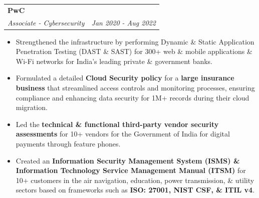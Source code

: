 \documentclass[letterpaper,11pt]{article}
\makeatletter
\newcommand{\resumeItem}[1]{
  \item\small{
    {#1 \vspace{-2pt}}
  }
}
\newcommand{\resumeSubheading}[4]{
  \vspace{-2pt}\item
    \begin{tabular*}{0.97\textwidth}[t]{l@{\extracolsep{\fill}}r}
      \textbf{#1} & #2 \\
      \textit{\small#3} & \textit{\small #4} \\
    \end{tabular*}\vspace{0pt}
}
\newcommand{\resumeItemListStart}{\begin{itemize}}
\newcommand{\resumeItemListEnd}{\end{itemize}\vspace{-5pt}}
\makeatother
\begin{document}
\resumeSubheading
      {PwC}{}
      {Associate - Cybersecurity }{Jan 2020 - Aug 2022}
      \resumeItemListStart
        \resumeItem{}
          {Strengthened the infrastructure by performing Dynamic \& Static Application Penetration Testing (DAST \& SAST) for 300+ web \& mobile applications \& Wi-Fi networks for India's leading private \& government banks.}
       \resumeItem{}
       {Formulated a detailed \textbf{Cloud Security policy} for a \textbf{large insurance business} that streamlined access controls and monitoring processes, ensuring compliance and enhancing data security for 1M+ records during their cloud migration. } 
       \resumeItem{}
       {Led the \textbf{technical \& functional third-party vendor security assessments} for 10+ vendors for the Government of India for digital payments through feature phones. }
        \resumeItem{}
        {Created an \textbf{Information Security Management System (ISMS) \& Information Technology Service Management Manual (ITSM)} for 10+ customers in the air navigation, education, power transmission, \& utility sectors based on frameworks such as\textbf{ ISO: 27001, NIST CSF, \& ITIL v4}.}
        
      \resumeItemListEnd

    
\end{document}

